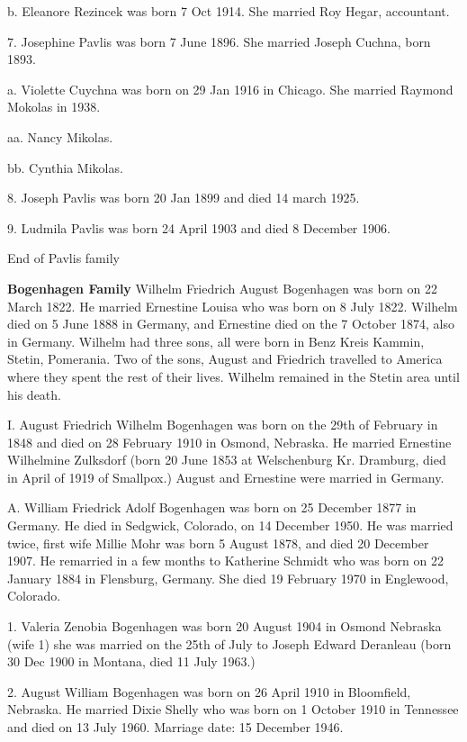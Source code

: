 \documentclass[a4paper]{article}
\begin{document}
b. Eleanore Rezincek was born 7 Oct 1914.  She married Roy Hegar, accountant.

7. Josephine Pavlis was born 7 June 1896.  She married Joseph Cuchna, born 1893.  

a. Violette Cuychna was born on 29 Jan 1916 in Chicago.  She married Raymond Mokolas in 1938.

aa. Nancy Mikolas.

bb. Cynthia Mikolas.

8. Joseph Pavlis was born 20 Jan 1899 and died 14 march 1925.

9. Ludmila Pavlis was born 24 April 1903 and died 8 December 1906.  

\vskip 4mm
End of Pavlis family
\pagebreak

{\noindent \Huge \bf Bogenhagen Family}
\vskip 6mm
	Wilhelm Friedrich August Bogenhagen was born on 22 March 1822.  He married Ernestine Louisa who was born on 8 July 1822.  Wilhelm died on 5 June 1888 in Germany, and Ernestine died on the 7 October 1874, also in Germany.  Wilhelm had three sons, all were born in Benz Kreis Kammin, Stetin, Pomerania.   Two of the sons, August and Friedrich travelled to America where they spent the rest of their lives. Wilhelm remained in the Stetin area until his death.

I. August Friedrich Wilhelm Bogenhagen was born on the 29th of February in 1848 and died on 28 February 1910 in Osmond, Nebraska.  He married Ernestine Wilhelmine Zulksdorf  (born 20 June 1853 at Welschenburg Kr. Dramburg, died in April of 1919 of Smallpox.)  August and Ernestine were married in Germany.  

A. William Friedrick Adolf Bogenhagen was born on 25 December 1877 in Germany. He died in Sedgwick, Colorado, on 14 December 1950.  He was married twice, first wife Millie Mohr was born 5 August 1878, and died 20 December 1907.  He remarried in a few months to  Katherine Schmidt who was born on 22 January 1884 in Flensburg, Germany. She died 19 February 1970 in Englewood, Colorado.
		
1. Valeria Zenobia Bogenhagen was born 20 August 1904 in Osmond Nebraska (wife 1) she was married on the 25th of July to Joseph Edward Deranleau (born 30 Dec 1900 in Montana, died 11 July 1963.)

2. August William Bogenhagen was born on 26 April 1910 in Bloomfield, Nebraska.  He married Dixie Shelly who was born on 1 October 1910 in Tennessee and died on 13 July 1960.  Marriage date: 15 December 1946.
\end{document}
